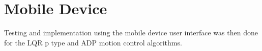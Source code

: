 
\section{Mobile Device}
Testing and implementation using the mobile device user interface was then done for the LQR p type and ADP motion control algorithms.
